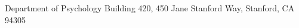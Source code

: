 \address{Stanford University}{Department of Psychology}%
    {Building 420, 450 Jane Stanford Way, Stanford, CA 94305}
